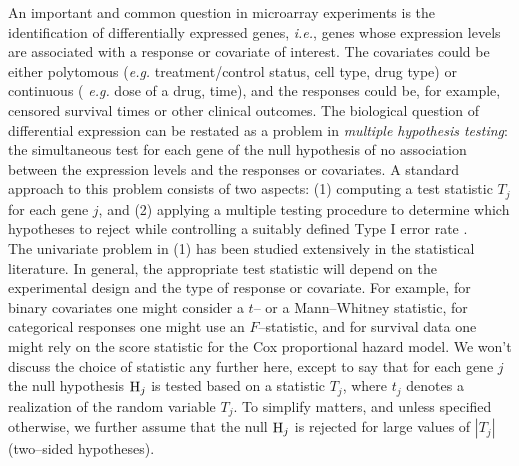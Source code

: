 \documentclass[11pt]{article}
\begin{document}
An important and common question in microarray experiments is the
identification of differentially expressed genes, {\it i.e.}, genes
whose expression levels are associated with a response or covariate of
interest. The covariates could be either polytomous ({\it e.g.}
treatment/control status, cell type, drug type) or continuous ({\it
  e.g.} dose of a drug, time), and the responses could be, for
example, censored survival times or other clinical outcomes. The
biological question of differential expression can be restated as a
problem in {\it multiple hypothesis testing}: the simultaneous test for each
gene of the null hypothesis of no association between the expression
levels and the responses or covariates. 
A standard approach to this problem consists of two aspects: (1) computing a test statistic $T_j$ for each gene $j$, and (2) applying a multiple testing procedure to determine which hypotheses to reject while controlling a suitably defined Type I error rate \citep{DudoitetalSinica02,Efronetal01,Golubetal,Manduchietal00,Tusheretal,Westfalletal01}.\\

The univariate problem in (1) has been studied extensively in the
statistical literature. In general, the appropriate test statistic
will depend on the experimental design and the type of response or
covariate. For example, for binary covariates one might consider a
$t$-- or a Mann--Whitney statistic, for categorical responses one might
use an $F$--statistic, and for survival data one might rely on the
score statistic for the Cox proportional hazard model. We won't
discuss the choice of statistic any further here, except to say that
for each gene $j$ the null hypothesis ${\rm H}_j$ is tested based on a
statistic $T_j$, where $t_j$ denotes a realization of the random
variable $T_j$. To simplify matters, and unless specified otherwise, we further assume 
that the null ${\rm H}_j$ is rejected for large values of $|T_j|$
(two--sided hypotheses).  \\
\end{document}
